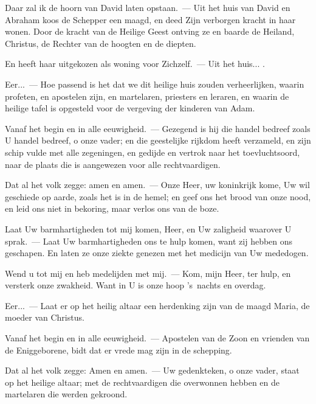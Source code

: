 \documentclass[12pt,twoside,a5paper]{article}
\begin{document}

\begin{halfparskip}
  Daar zal ik de hoorn van David laten opstaan.~--- Uit het huis van David en Abraham koos de Schepper een maagd, en deed Zijn verborgen kracht in haar wonen. Door de kracht van de Heilige Geest ontving ze en baarde de Heiland, Christus, de Rechter van de hoogten en de diepten.

  En heeft haar uitgekozen als woning voor Zichzelf.~--- Uit het huis... .

  Eer...~--- Hoe passend is het dat we dit heilige huis zouden verheerlijken, waarin profeten, en apostelen zijn, en martelaren, priesters en leraren, en waarin de heilige tafel is opgesteld voor de vergeving der kinderen van Adam.

  Vanaf het begin en in alle eeuwigheid.~--- Gezegend is hij die handel bedreef zoals U handel bedreef, o onze vader; en die geestelijke rijkdom heeft verzameld, en zijn schip vulde met alle zegeningen, en gedijde en vertrok naar het toevluchtsoord, naar de plaats die is aangewezen voor alle rechtvaardigen.

  Dat al het volk zegge: amen en amen.~--- Onze Heer, uw koninkrijk kome, Uw wil geschiede op aarde, zoals het is in de hemel; en geef ons het brood van onze nood, en leid ons niet in bekoring, maar verlos ons van de boze.
\end{halfparskip}


\begin{halfparskip}
  Laat Uw barmhartigheden tot mij komen, Heer, en Uw zaligheid waarover U sprak.~--- Laat Uw barmhartigheden ons te hulp komen, want zij hebben ons geschapen. En laten ze onze ziekte genezen met het medicijn van Uw mededogen.

  Wend u tot mij en heb medelijden met mij.~--- Kom, mijn Heer, ter hulp, en versterk onze zwakheid. Want in U is onze hoop 's~nachts en overdag.

  Eer...~--- Laat er op het heilig altaar een herdenking zijn van de maagd Maria, de moeder van Christus.

  Vanaf het begin en in alle eeuwigheid.~--- Apostelen van de Zoon en vrienden van de Eniggeborene, bidt dat er vrede mag zijn in de schepping.

  Dat al het volk zegge: Amen en amen.~--- Uw gedenkteken, o onze vader, staat op het heilige altaar; met de rechtvaardigen die overwonnen hebben en de martelaren die werden gekroond.
\end{halfparskip}
\end{document}
